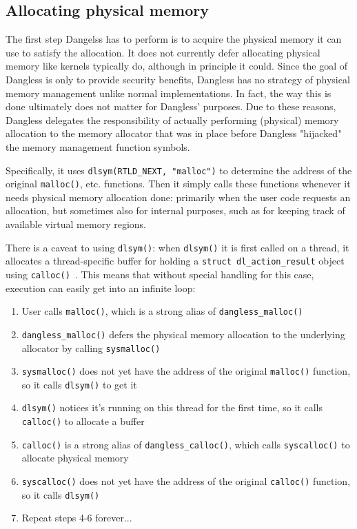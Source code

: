 \subsection{Allocating physical memory}

The first step Dangelss has to perform is to acquire the physical memory it can use to satisfy the allocation. It does not currently defer allocating physical memory like kernels typically do, although in principle it could.
Since the goal of Dangless is only to provide security benefits, Dangless has no strategy of physical memory management unlike normal implementations. In fact, the way this is done ultimately does not matter for Dangless' purposes. Due to these reasons, Dangless delegates the responsibility of actually performing (physical) memory allocation to the memory allocator that was in place before Dangless "hijacked" the memory management function symbols.

Specifically, it uses \lstinline!dlsym(RTLD_NEXT, "malloc")! to determine the address of the original \lstinline!malloc()!, etc. functions. Then it simply calls these functions whenever it needs physical memory allocation done: primarily when the user code requests an allocation, but sometimes also for internal purposes, such as for keeping track of available virtual memory regions.

There is a caveat to using \lstinline!dlsym()!: when \lstinline!dlsym()! it is first called on a thread, it allocates a thread-specific buffer for holding a \lstinline!struct dl_action_result! object using \lstinline!calloc()!~\cite{glibc-dlsym-calls-calloc}. This means that without special handling for this case, execution can easily get into an infinite loop:

\begin{enumerate}
	\item User calls \lstinline!malloc()!, which is a strong alias of \lstinline!dangless_malloc()!
	\item \lstinline!dangless_malloc()! defers the physical memory allocation to the underlying allocator by calling \lstinline!sysmalloc()!
	\item \lstinline!sysmalloc()! does not yet have the address of the original \lstinline!malloc()! function, so it calls \lstinline!dlsym()! to get it
	\item \lstinline!dlsym()! notices it's running on this thread for the first time, so it calls \lstinline!calloc()! to allocate a buffer
	\item \lstinline!calloc()! is a strong alias of \lstinline!dangless_calloc()!, which calls \lstinline!syscalloc()! to allocate physical memory
	\item \lstinline!syscalloc()! does not yet have the address of the original \lstinline!calloc()! function, so it calls \lstinline!dlsym()!
	\item Repeat steps 4-6 forever...
\end{enumerate}

